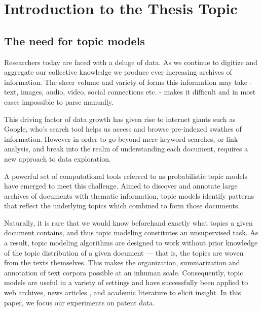 
\chapter{Introduction to the Thesis Topic} %

\label{Chapter1} %


\newcommand{\keyword}[1]{\textbf{#1}}
\newcommand{\tabhead}[1]{\textbf{#1}}
\newcommand{\code}[1]{\texttt{#1}}
\newcommand{\file}[1]{\texttt{\bfseries#1}}
\newcommand{\option}[1]{\texttt{\itshape#1}}

\section{The need for topic models}
Researchers today are faced with a deluge of data. As we continue to digitize and aggregate our collective knowledge we produce ever increasing archives of information. The sheer volume and variety of forms this information may take - text, images, audio, video, social connections etc. - makes it difficult and in most cases impossible to parse manually. 

This driving factor of data growth has given rise to internet giants such as Google, who's search tool helps us access and browse pre-indexed swathes of information. However in order to go beyond mere keyword searches, or link analysis, and break into the realm of understanding each document, requires a new approach to data exploration.

A powerful set of computational tools referred to as probabilistic topic models have emerged to meet this challenge. Aimed to discover and annotate large archives of documents with thematic information, topic models identify patterns that reflect the underlying topics which combined to form those documents.

Naturally, it is rare that we would know beforehand exactly what topics a given document contains, and thus topic modeling constitutes an unsupervised task. As a result, topic modeling algorithms are designed to work without prior knowledge of the topic distribution of a given document — that is, the topics are woven from the texts themselves. This makes the organization, summarization and annotation of text corpora possible at an inhuman scale. Consequently, topic models are useful in a variety of settings and have successfully been applied to web archives, news articles \parencite{Newman:2006:AET:2106961.2106971}, and academic literature \parencite{Steyvers:2004:PAM:1014052.1014087} to elicit insight. In this paper, we focus our experiments on patent data.


